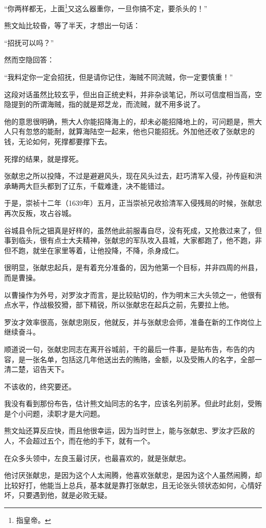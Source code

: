 \begin{multicols}{\theparacolNo}
		“你两样都无，上面\footnote{指皇帝。}又这么器重你，一旦你搞不定，要杀头的！”

		熊文灿比较昏，等了半天，才想出一句话：

		“招抚可以吗？”

		然而空隐回答：

		“我料定你一定会招抚，但是请你记住，海贼不同流贼，你一定要慎重！”

		这段对话虽然比较玄乎，但出自正统史料，并非杂谈笔记，所以可信度相当高，空隐提到的所谓海贼，指的就是郑芝龙，而流贼，就不用多说了。

		他的意思很明确，熊大人你能招降海上的，却未必能招降地上的，可问题是，熊大人只有忽悠的能耐，就算海陆空一起来，他也只能招抚。外加他还收了张献忠的钱，无论如何，死撑都要撑下去。

		死撑的结果，就是撑死。

		张献忠之所以投降，不过是避避风头，现在风头过去，赶巧清军入侵，孙传庭和洪承畴两大巨头都到了辽东，千载难逢，决不能错过。

		于是，崇祯十二年（1639年）五月，正当崇祯兄收拾清军入侵残局的时候，张献忠再次反叛，攻占谷城。

		谷城县令阮之钿真是好样的，虽然他此前服毒自尽，没有死成，又抢救过来了，但事到临头，很有点士大夫精神，张献忠的军队攻入县城，大家都跑了，他不跑，非但不跑，就坐在家里等着，让他投降，不降，杀身成仁。

		很明显，张献忠起兵，是有着充分准备的，因为他第一个目标，并非四周的州县，而是曹操。

		以曹操作为外号，对罗汝才而言，是比较贴切的，作为明末三大头领之一，他很有点水平，作战极狡猾，部下精锐，所以张献忠在起兵之前，先要拉上他。

		罗汝才效率很高，张献忠刚反，他就反，并与张献忠会师，准备在新的工作岗位上继续奋斗。

		顺道说一句，张献忠同志在离开谷城前，干的最后一件事，是贴布告，布告的内容，是一张名单，包括这几年他送出去的贿赂，金额，以及受贿人的名字，全部一清二楚，诏告天下。

		不该收的，终究要还。

		我没有看到那份布告，估计熊文灿同志的名字，应该名列前茅。但此时此刻，受贿是个小问题，渎职才是大问题。

		熊文灿还算反应快，而且他很幸运，因为当时世上，能与张献忠、罗汝才匹敌的人，不会超过五个，而在他的手下，就有一个。

		在众多头领中，左良玉最讨厌，也最喜欢的，就是张献忠。

		他讨厌张献忠，是因为这个人太闹腾，他喜欢张献忠，是因为这个人虽然闹腾，却比较好打，他能当上总兵，基本就是靠打张献忠，且无论张头领状态如何，心情好坏，只要遇到他，就是必败无疑。


\end{multicols}
